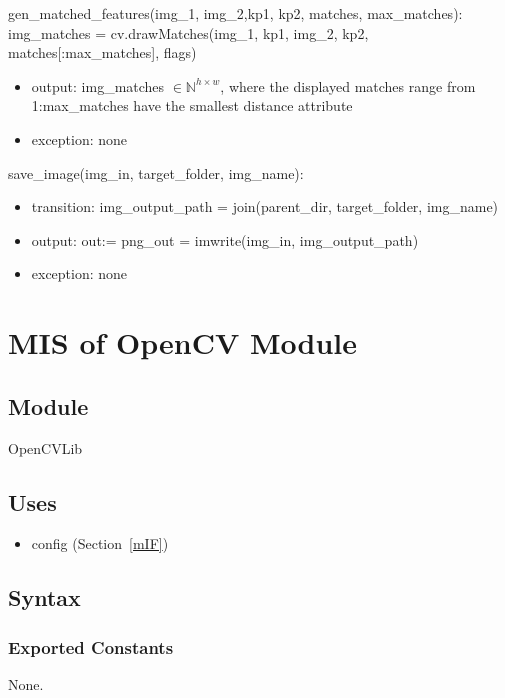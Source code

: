 \documentclass[12pt, titlepage]{article}
\begin{document}
\noindent gen\_matched\_features(img\_1, img\_2,kp1, kp2, matches, max\_matches): \newline 
img\_matches = cv.drawMatches(img\_1, kp1, img\_2, kp2, matches[:max\_matches], 
flags)
\begin{itemize}
  \item output: img\_matches $\in \mathbb{N}^{h \times w}$, where the displayed matches 
  range from 1:max\_matches have the smallest distance attribute
  \item exception: none
\end{itemize}

save\_image(img\_in, target\_folder, img\_name):
\begin{itemize}
  \item transition: img\_output\_path = join(parent\_dir, target\_folder, img\_name)
\end{itemize}

\begin{itemize}
  \item output: out:= png\_out = imwrite(img\_in, img\_output\_path)
  \item exception: none
\end{itemize}




\section{MIS of OpenCV Module} \label{mOpenCV}
\subsection{Module}
OpenCVLib

\subsection{Uses}
\begin{itemize}
  \item config (Section~\ref{mIF})
\end{itemize}

\subsection{Syntax}
\subsubsection{Exported Constants}
None.
\end{document}
